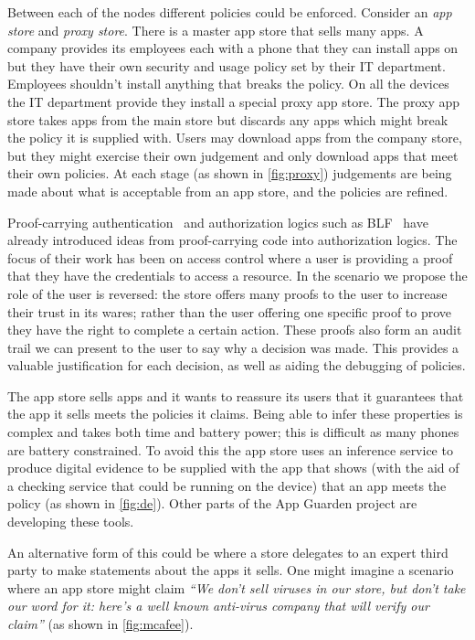 \documentclass[a4paper,sfsidenotes]{%
  article%
}
\begin{document}
Between each of the nodes different policies could be enforced.  Consider an
\emph{app store} and \emph{proxy store}.  There is a master app store that sells
many apps.  A company provides its employees each with a phone that they can
install apps on but they have their own security and usage policy set by their
IT department.  Employees shouldn't install anything that breaks the policy. On
all the devices the IT department provide they install a special proxy app
store.  The proxy app store takes apps from the main store but discards any apps
which might break the policy it is supplied with.  Users may download apps from
the company store, but they might exercise their own judgement and only download
apps that meet their own policies.  At each stage (as shown in
\autoref{fig:proxy}) judgements are being made about what is acceptable from
an app store, and the policies are refined.

Proof-carrying authentication~\cite{Appel:1999dq} and authorization logics such
as BLF~\cite{Whitehead:2004bu} have already introduced ideas from proof-carrying
code into authorization logics. The focus of their work has been on access
control where a user is providing a proof that they have the credentials to
access a resource.   In the scenario we propose the role of the user is
reversed: the store offers many proofs to the user to increase their trust in
its wares; rather than the user offering one specific proof to prove they have
the right to complete a certain action.  These proofs also form an audit trail
we can present to the user to say why a decision was made.  This provides a
valuable justification for each decision, as well as aiding the debugging of
policies.

The app store sells apps and it wants to reassure its users that
it guarantees that the app it sells meets the policies it
claims.  Being able to infer these properties is complex and takes both time and
battery power; this is difficult as many phones are battery constrained.  To
avoid this the app store uses an inference service to produce digital evidence
to be supplied with the app that shows (with the aid of a checking service that
could be running on the device) that an app meets the policy (as shown in
\autoref{fig:de}). Other parts of the App Guarden project are 
developing these tools.

An alternative form of this could be where a store delegates to an expert third
party to make statements about the apps it sells.  One might imagine a scenario
where an app store might claim \emph{``We don't sell viruses in our store, but
don't take our word for it: here's a well known anti-virus company that will
verify our claim''} (as shown in \autoref{fig:mcafee}).
\end{document}
